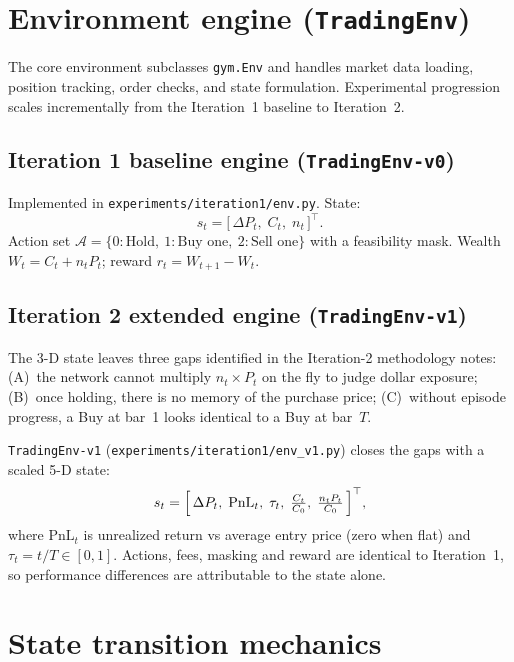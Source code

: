 \section{Environment engine (\texttt{TradingEnv})}
\label{sec:env_engine_simple}

The core environment subclasses \texttt{gym.Env} and handles market data loading, position tracking, order checks, and state formulation. Experimental progression scales incrementally from the Iteration~1 baseline to Iteration~2.

\subsection{Iteration 1 baseline engine (\texttt{TradingEnv-v0})}
\label{sec:tradingenv_v0}

Implemented in \texttt{experiments/iteration1/env.py}. State:
\begin{equation}
  s_t = \bigl[\, \Delta P_t,\; C_t,\; n_t \,\bigr]^\top .
\end{equation}
Action set $\mathcal{A} = \{0:\text{Hold},\ 1:\text{Buy one},\ 2:\text{Sell one}\}$ with a feasibility mask. Wealth $W_t = C_t + n_t P_t$; reward $r_t = W_{t+1} - W_t$.

\subsection{Iteration 2 extended engine (\texttt{TradingEnv-v1})}
\label{sec:tradingenv_v1}

The 3-D state leaves three gaps identified in the Iteration-2 methodology notes: (A)~the network cannot multiply $n_t{\times}P_t$ on the fly to judge dollar exposure; (B)~once holding, there is no memory of the purchase price; (C)~without episode progress, a Buy at bar~1 looks identical to a Buy at bar~$T$.

\texttt{TradingEnv-v1} (\texttt{experiments/iteration1/env\_v1.py}) closes the gaps with a scaled 5-D state:
\begin{equation}
  s_t = \Bigl[\, \Delta P_t,\; \mathrm{PnL}_t,\; \tau_t,\; \tfrac{C_t}{C_0},\; \tfrac{n_t P_t}{C_0} \,\Bigr]^\top ,
\end{equation}
where $\mathrm{PnL}_t$ is unrealized return vs average entry price (zero when flat) and $\tau_t = t/T \in [0,1]$. Actions, fees, masking and reward are identical to Iteration~1, so performance differences are attributable to the state alone.

\section{State transition mechanics}
\label{sec:transition_mechanics}

